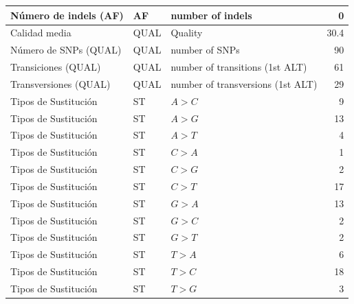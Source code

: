 \documentclass[12pt]{article}
\begin{document}
\begin{longtable}{|l|l|p{8cm}|r|}
    \hline
    Número de indels (AF) & AF & number of indels & 0 \\
    \hline
    Calidad media & QUAL & Quality & 30.4 \\
    \hline
    Número de SNPs (QUAL) & QUAL & number of SNPs & 90 \\
    \hline
    Transiciones (QUAL) & QUAL & number of transitions (1st ALT) & 61 \\
    \hline
    Transversiones (QUAL) & QUAL & number of transversions (1st ALT) & 29 \\
    \hline
    Tipos de Sustitución & ST & $A > C $ & 9 \\
    \hline
    Tipos de Sustitución & ST & $A > G $ & 13 \\
    \hline
    Tipos de Sustitución & ST & $ A > T $ & 4 \\
    \hline
    Tipos de Sustitución & ST & $ C > A $ & 1 \\
    \hline
    Tipos de Sustitución & ST & $ C > G $ & 2 \\
    \hline
    Tipos de Sustitución & ST & $ C > T $ & 17 \\
    \hline
    Tipos de Sustitución & ST & $ G > A $ & 13 \\
    \hline
    Tipos de Sustitución & ST & $ G > C $ & 2 \\
    \hline
    Tipos de Sustitución & ST & $ G > T $ & 2 \\
    \hline
    Tipos de Sustitución & ST & $ T > A $ & 6 \\
    \hline
    Tipos de Sustitución & ST & $ T > C $ & 18 \\
    \hline
    Tipos de Sustitución & ST & $ T > G $  & 3 \\
    \hline
    
\end{longtable}

\clearpage
\singlespacing %
\end{document}

